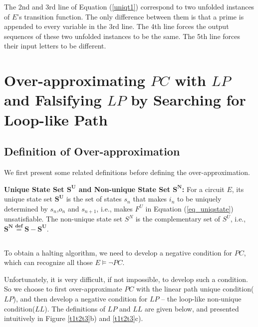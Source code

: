 \documentclass[journal]{IEEEtran}
\begin{document}
The 2nd and 3rd line of Equation (\ref{uniqt1}) correspond to two unfolded instances of $E$'s transition function.
The only difference between them is that a prime is appended to every variable in the 3rd line.
The 4th line forces the output sequences of these two unfolded instances to be the same.
The 5th line forces their input letters to be different.

\section{Over-approximating $PC$ with $LP$ and Falsifying $LP$ by Searching for Loop-like Path}\label{sec_t2t3}

\subsection{Definition of Over-approximation}\label{subsec_loopdef}

We first present some related definitions before defining the over-approximation.

\begin{definition11}\label{def_uniqstate}%
\textbf{Unique State Set $\boldsymbol{S^{U}}$ and Non-unique State Set $\boldsymbol{S^{N}}$:}
For a circuit $E$,
its unique state set $\boldsymbol{S^{U}}$ is the set of states $s_{n}$ that makes $i_n$ to be uniquely determined by $s_n$,$o_n$ and $s_{n+1}$,
i.e.,
makes $F^U$ in Equation (\ref{eq_uniqstate}) unsatisfiable.
The non-unique state set $S^{N}$ is the complementary set of $S^{U}$,
i.e.,
$\boldsymbol{S^{N}\overset{def}{=}S-S^{U}}$.
\end{definition11}


\begin{equation}\label{eq_uniqstate}
\end{equation}
%

To obtain a halting algorithm,
we need to develop a negative condition for $PC$,
which can recognize all those $E\vDash\neg PC$.

Unfortunately,
it is very difficult,
if not impossible,
to develop such a condition.
So we choose to first over-approximate $PC$ with the linear path unique condition($LP$),
and then develop a negative condition for $LP$
--
the loop-like non-unique condition($LL$).
The definitions of $LP$ and $LL$ are given below,
and presented intuitively in Figure \ref{t1t2t3}b) and \ref{t1t2t3}c).
\end{document}
